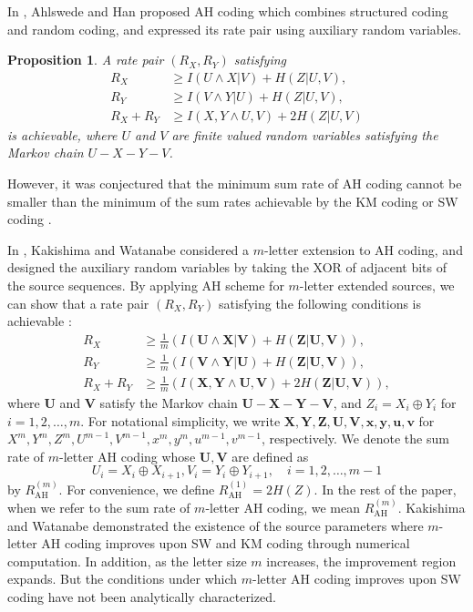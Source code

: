 \documentclass[journal,onecolumn]{IEEEtran}
\newtheorem{proposition}[theorem]{Proposition}
\theoremstyle{definition}
\theoremstyle{remark}
\newcommand{\xm}{\bm{x}}
\newcommand{\ym}{\bm{y}}
\newcommand{\um}{\bm{u}}
\newcommand{\vm}{\bm{v}}
\newcommand{\Xm}{\bm{X}}
\newcommand{\Ym}{\bm{Y}}
\newcommand{\Um}{\bm{U}}
\newcommand{\Vm}{\bm{V}}
\newcommand{\Zm}{\bm{Z}}
\begin{document}
In \cite{AH}, Ahlswede and Han proposed AH coding which combines structured coding and random coding, and expressed its rate pair using auxiliary random variables.
\begin{proposition}
    A rate pair $(R_X,R_Y)$ satisfying
    \begin{equation}
        \begin{aligned}\label{rate:AH}
            R_X &\geq I(U \wedge X|V)+H(Z|U,V),\\
            R_Y &\geq I(V \wedge Y|U)+H(Z|U,V),\\
            R_X + R_Y &\geq I(X,Y\wedge U,V) + 2H(Z|U,V)
        \end{aligned}
    \end{equation}
    is achievable, where $U$ and $V$ are finite valued random variables satisfying the Markov chain $U-X-Y-V$.
\end{proposition}
However, it was conjectured that the minimum sum rate of AH coding cannot be smaller than the minimum of the sum rates achievable by the KM coding or SW coding \cite{conjecture}.

In \cite{KW}, Kakishima and Watanabe considered a $m$-letter extension to AH coding, and designed the auxiliary random variables by taking the XOR of adjacent bits of the source sequences.
By applying AH scheme for $m$-letter extended sources, we can show that a rate pair $(R_X,R_Y)$ satisfying the following conditions is achievable :
\begin{align*}
    R_X &\geq \frac{1}{m}\left(I(\Um \wedge \Xm|\Vm)+H(\Zm|\Um,\Vm)\right),\\
    R_Y &\geq \frac{1}{m}\left(I(\Vm \wedge \Ym|\Um)+H(\Zm|\Um,\Vm)\right),\\
    R_X + R_Y &\geq \frac{1}{m}\left(I(\Xm,\Ym\wedge \Um,\Vm) + 2H(\Zm|\Um,\Vm)\right),
\end{align*}   
where $\Um$ and $\Vm$ satisfy the Markov chain $\Um-\Xm-\Ym-\Vm$, and $Z_i=X_i \oplus Y_i$ for $i=1,2,\ldots,m$.
For notational simplicity, we write $\Xm,\Ym,\Zm,\Um,\Vm,\xm,\ym,\um,\vm$ for $X^m,Y^m,Z^m,U^{m-1},V^{m-1},x^m,y^m,u^{m-1},v^{m-1}$, respectively.
We denote the sum rate of $m$-letter AH coding whose $\Um,\Vm$ are defined as
\begin{equation*}
U_i=X_i\oplus X_{i+1},  V_i=Y_i\oplus Y_{i+1}, \quad i=1,2,\ldots,m-1    
\end{equation*}
by $R^{(m)}_{\mathrm{AH}}$.
For convenience, we define $R_{\mathrm{AH}}^{(1)}=2H(Z)$.
In the rest of the paper, when we refer to the sum rate of $m$-letter AH coding, we mean $R^{(m)}_{\mathrm{AH}}$.
Kakishima and Watanabe demonstrated the existence of the source parameters where $m$-letter AH coding improves upon SW and KM coding through numerical computation.
In addition, as the letter size $m$ increases, the improvement region expands.
But the conditions under which $m$-letter AH coding improves upon SW coding have not been analytically characterized.
\end{document}
